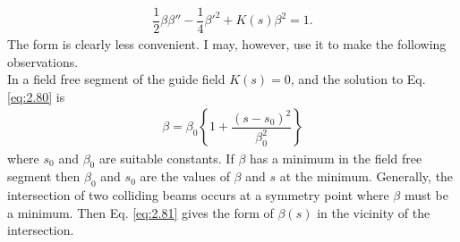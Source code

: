 \begin{align}\label{eq:2.80}
	\dfrac{1}{2}\beta\beta'' - \dfrac{1}{4}\beta'^2 + K(s)\beta^2 = 1.
\end{align}
The form is clearly less convenient. I may, however, use it to make the following observations.\\
In a field free segment of the guide field $K(s) = 0$, and the solution to Eq. \eqref{eq:2.80} is
\begin{align}\label{eq:2.81}
	\beta = \beta_0 \left\lbrace 1 + \dfrac{(s-s_0)^2}{\beta_0^2} \right\rbrace
\end{align}
where $s_0$ and $\beta_0$ are suitable constants. If $\beta$ has a minimum in the field free segment then $\beta_0$ and $s_0$ are the values of $\beta$ and $s$ at the minimum. Generally, the
intersection of two colliding beams occurs at a symmetry point where $\beta$ must be a minimum. Then Eq. \eqref{eq:2.81} gives the form of $\beta(s)$ in the vicinity of the intersection.

